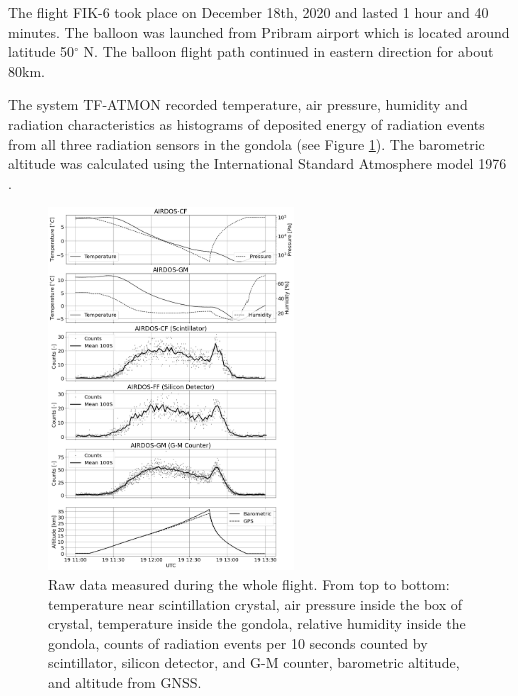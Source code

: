 \documentclass{Rpd}
\begin{document}
The flight FIK-6 took place on December 18th, 2020 and lasted 1 hour and 40 minutes. The balloon was launched from Pribram airport which is located around latitude 50$^{\circ}$ N. The balloon flight path continued in eastern direction for about 80km. 

The system TF-ATMON recorded temperature, air pressure, humidity and radiation characteristics as histograms of deposited energy of radiation events from all three radiation sensors in the gondola (see Figure \ref{FIK-6_RAW_data}). The barometric altitude was calculated using the International Standard Atmosphere model 1976 \cite{standard_atmosphere}. 


\begin{figure}%
	\centerline{\includegraphics[width=65mm]{img/FIK-6_RAW_data.png}}
	\caption{Raw data measured during the whole flight. From top to bottom: temperature near scintillation crystal, air pressure inside the box of crystal, temperature inside the gondola, relative humidity inside the gondola, counts of radiation events per 10 seconds counted by scintillator, silicon detector, and  G-M counter, barometric altitude, and altitude from GNSS.\label{FIK-6_RAW_data}}
\end{figure}
\end{document}
